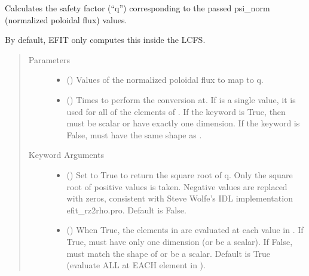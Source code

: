 \documentclass[letterpaper,10pt,english]{sphinxmanual}
\begin{document}
\begin{fulllineitems}
\begin{fulllineitems}
\label{\detokenize{eqtools:eqtools.core.Equilibrium.psinorm2q}}
Calculates the safety factor (“q”) corresponding to the passed psi\_norm (normalized poloidal flux) values.

By default, EFIT only computes this inside the LCFS.
\begin{quote}\begin{description}
\item[{Parameters}] \leavevmode\begin{itemize}
\item {} 
 () \textendash{} Values of the normalized
poloidal flux to map to q.

\item {} 
 () \textendash{} Times to perform the conversion at.
If  is a single value, it is used for all of the elements of
. If the  keyword is True, then  must be scalar
or have exactly one dimension. If the  keyword is False,
 must have the same shape as .

\end{itemize}

\item[{Keyword Arguments}] \leavevmode\begin{itemize}
\item {} 
 () \textendash{} Set to True to return the square root of q. Only
the square root of positive values is taken. Negative values are
replaced with zeros, consistent with Steve Wolfe’s IDL
implementation efit\_rz2rho.pro. Default is False.

\item {} 
 () \textendash{} When True, the elements in  are evaluated at
each value in . If True,  must have only one dimension (or
be a scalar). If False,  must match the shape of  or be
a scalar. Default is True (evaluate ALL  at EACH element in
).


\end{itemize}
\end{description}
\end{quote}
\end{fulllineitems}
\end{fulllineitems}
\end{document}
